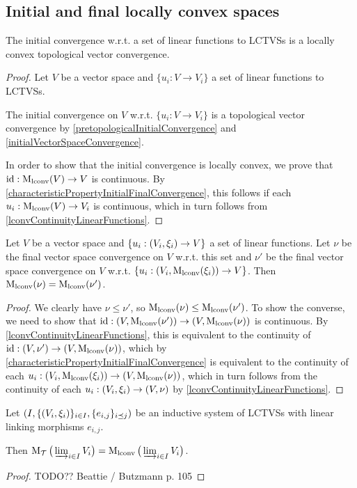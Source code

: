 \subsection{Initial and final locally convex spaces}
\begin{proposition}
The initial convergence w.r.t. a set of linear functions to LCTVSs is a locally convex topological vector convergence.
\end{proposition}
\begin{proof}
Let $V$ be a vector space and $\{u_i: V\to V_i\}$ a set of linear functions to LCTVSs.

The initial convergence on $V$ w.r.t. $\{u_i: V\to V_i\}$ is a topological vector convergence by \ref{pretopologicalInitialConvergence} and \ref{initialVectorSpaceConvergence}.

In order to show that the initial convergence is locally convex, we prove that $\operatorname{id}: \operatorname{M_\text{lconv}}(V) \to V$ is continuous. By \ref{characteristicPropertyInitialFinalConvergence}, this follows if each $u_i: \operatorname{M_\text{lconv}}(V) \to V_i$ is continuous, which in turn follows from \ref{lconvContinuityLinearFunctions}.
\end{proof}

\begin{proposition}
Let $V$ be a vector space and $\{u_i: \sSet{V_i, \xi_i} \to V\}$ a set of linear functions. Let $\nu$ be the final vector space convergence on $V$ w.r.t. this set and $\nu'$ be the final vector space convergence on $V$ w.r.t. $\{u_i: \sSet{V_i, \lconvMod(\xi_i)} \to V\}$. Then $\operatorname{M_\text{lconv}}(\nu) = \operatorname{M_\text{lconv}}(\nu')$.
\end{proposition}
\begin{proof}
We clearly have $\nu \leq \nu'$, so $\operatorname{M_\text{lconv}}(\nu) \leq \operatorname{M_\text{lconv}}(\nu')$. To show the converse, we need to show that $\id: \sSet{V, \lconvMod(\nu')} \to \sSet{V, \lconvMod(\nu)}$ is continuous. By \ref{lconvContinuityLinearFunctions}, this is equivalent to the continuity of $\id: \sSet{V, \nu'} \to \sSet{V, \lconvMod(\nu)}$, which by \ref{characteristicPropertyInitialFinalConvergence} is equivalent to the continuity of each $u_i: \sSet{V_i, \lconvMod(\xi_i)} \to \sSet{V, \lconvMod(\nu)}$, which in turn follows from the continuity of each $u_i: \sSet{V_i, \xi_i}\to \sSet{V, \nu}$ by \ref{lconvContinuityLinearFunctions}.
\end{proof}

\begin{proposition}
Let $\sSet{I, \{\sSet{V_i, \xi_i}\}_{i\in I}, \{e_{i,j}\}_{i\preceq j}}$ be an inductive system of LCTVSs with linear linking morphisms $e_{i,j}$.

Then $\operatorname{M_\mathcal{T}}\big(\varinjlim_{i\in I}V_i\big) = \operatorname{M_\text{lconv}}\big(\varinjlim_{i\in I}V_i\big)$.
\end{proposition}
\begin{proof}
TODO?? Beattie / Butzmann p. 105
\end{proof}

